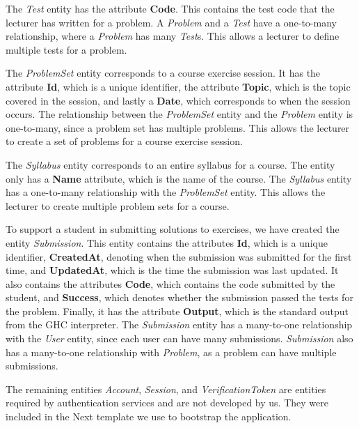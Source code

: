 The \textit{Test} entity has the attribute \textbf{Code}. This contains the test code that the lecturer has written for a problem. A \textit{Problem} and a \textit{Test} have a one-to-many relationship, where a \textit{Problem} has many \textit{Test}s. This allows a lecturer to define multiple tests for a problem.

The \textit{ProblemSet} entity corresponds to a course exercise session. It has the attribute \textbf{Id}, which is a unique identifier, the attribute \textbf{Topic}, which is the topic covered in the session, and lastly a \textbf{Date}, which corresponds to when the session occurs. The relationship between the \textit{ProblemSet} entity and the \textit{Problem} entity is one-to-many, since a problem set has multiple problems. This allows the lecturer to create a set of problems for a course exercise session.

The \textit{Syllabus} entity corresponds to an entire syllabus for a course. The entity only has a \textbf{Name} attribute, which is the name of the course. The \textit{Syllabus} entity has a one-to-many relationship with the \textit{ProblemSet} entity. This allows the lecturer to create multiple problem sets for a course.

To support a student in submitting solutions to exercises, we have created the entity \textit{Submission}. This entity contains the attributes \textbf{Id}, which is a unique identifier, \textbf{CreatedAt}, denoting when the submission was submitted for the first time, and \textbf{UpdatedAt}, which is the time the submission was last updated. It also contains the attributes \textbf{Code}, which contains the code submitted by the student, and \textbf{Success}, which denotes whether the submission passed the tests for the problem. Finally, it has the attribute \textbf{Output}, which is the standard output from the GHC interpreter.
The \textit{Submission} entity has a many-to-one relationship with the \textit{User} entity, since each user can have many submissions. \textit{Submission} also has a many-to-one relationship with \textit{Problem}, as a problem can have multiple submissions.

The remaining entities \textit{Account}, \textit{Session}, and \textit{VerificationToken} are entities required by authentication services and are not developed by us.
They were included in the Next template we use to bootstrap the application.


